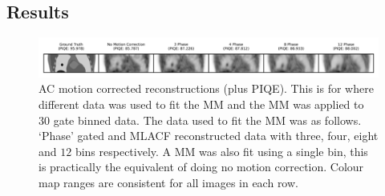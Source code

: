                 
        
        \subsection{Results} \label{sec:evaluation_of_pet_ct_motion_correction_incorporating_motion_models_using_mlacf_and_complex_gating_schemes_results}
            \begin{figure}
                \centering
                
                \includegraphics[width=1.0\linewidth]{figures/motion_correction_2_results_2_phase_visual_analysis.png}
                
                \captionsetup{singlelinecheck=false}
                \caption{
                    \gls{AC} motion corrected reconstructions (plus \gls{PIQE}). This is for where different data was used to fit the \gls{MM} and the \gls{MM} was applied to $30$ gate binned data. The data used to fit the \gls{MM} was as follows. `Phase' gated and \gls{MLACF} reconstructed data with three, four, eight and $12$ bins respectively. A \gls{MM} was also fit using a single bin, this is practically the equivalent of doing no motion correction. Colour map ranges are consistent for all images in each row.
                }
                
                \label{fig:evaluation_of_pet_ct_motion_correction_incorporating_motion_models_using_mlacf_and_complex_gating_schemes_results_phase_visual_analysis}
            \end{figure}

